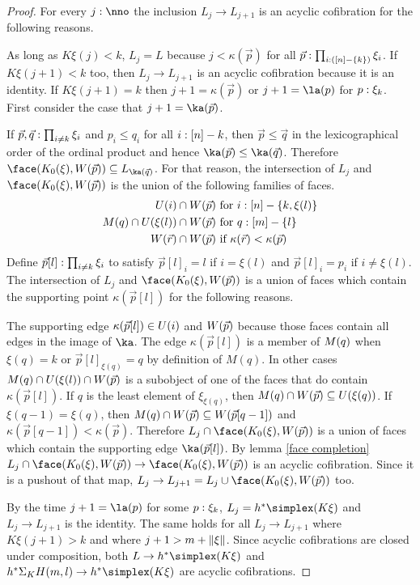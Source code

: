 \documentclass[csh.tex]{subfiles}
\begin{document}
\begin{proof}
For every $j\of\nno$ the inclusion $L_j\to L_{j+1}$ is an acyclic cofibration for the following reasons.

As long as $K\xi(j)<k$, $L_j = L$ because $j<\kappa(\vec p)$ for all $\vec p :\prod_{i:([n]-\left\{k\right\})}\xi_i$. If $K\xi(j+1)<k$ too, then $L_j\to L_{j+1}$ is an acyclic cofibration because it is an identity. If $K\xi(j+1) = k$ then $j+1=\kappa(\vec p)$ or $j+1 = \la(p)$ for $p:\xi_k$. First consider the case that $j+1=\ka(\vec p)$. 

If $\vec p,\vec q:\prod_{i\neq k} \xi_i$ and $p_i\leq q_i$ for all $i:[n]-k$, then $\vec p \leq \vec q$ in the lexicographical order of the ordinal product and hence $\ka(\vec p)\leq \ka(\vec q)$. Therefore $\face(K_0(\xi),\W(\vec p))\subseteq L_{\ka(\vec q)}$. For that reason, the intersection of $L_j$ and $\face(K_0(\xi),\W(\vec p))$ is the union of the following families of faces.
\begin{align*}
U(i)\cap W(\vec p) &\textrm{ for $i:[n]-\left\{k,\xi(l)\right\}$}\\
M(q)\cap U(\xi(l))\cap W(\vec p) &\textrm{ for $q:[m]-\left\{l\right\}$}\\
W(\vec r)\cap W(\vec p) &\textrm{ if $\kappa(\vec r)<\kappa(\vec p)$ }
\end{align*}
Define $\vec p[l]:\prod_{i\neq k} \xi_i$ to satisfy $\vec p[l]_i = l$ if $i=\xi(l)$ and $\vec p[l]_i = p_i$ if $i\neq \xi(l)$. The intersection of $L_j$ and $\face(K_0(\xi),\W(\vec p))$ is a union of faces which contain the supporting point $\kappa(\vec p[l])$ for the following reasons. 

The supporting edge $\kappa(\vec p[l])\in U(i)$ and $W(\vec p)$ because those faces contain all edges in the image of $\ka$. The edge $\kappa(\vec p[l])$ is a member of $M(q)$ when $\xi(q)=k$ or $\vec p[l]_{\xi(q)}=q$ by definition of $M(q)$. In other cases $M(q)\cap U(\xi(l))\cap W(\vec p)$ is a subobject of one of the faces that do contain $\kappa(\vec p[l])$. If $q$ is the least element of $\xi_{\xi(q)}$, then $M(q)\cap W(\vec p)\subseteq U(\xi(q))$. If $\xi(q-1)=\xi(q)$, then $M(q)\cap W(\vec p) \subseteq W(\vec p[q-1])$ and $\kappa(\vec p[q-1])<\kappa(\vec p)$. Therefore $L_j\cap \face(K_0(\xi),\W(\vec p))$ is a union of faces which contain the supporting edge $\ka(\vec p[l])$. By lemma \ref{face completion} $L_j\cap \face(K_0(\xi),\W(\vec p))\to \face(K_0(\xi),\W(\vec p))$ is an acyclic cofibration. Since it is a pushout of that map, $L_j\to L_{j+1} = L_j\cup \face(K_0(\xi),\W(\vec p))$ too.

By the time $j+1 = \la(p)$ for some $p: \xi_k$, $L_j = h\ri \simplex(K\xi)$ and $L_j\to L_{j+1}$ is the identity. The same holds for all $L_j\to L_{j+1}$ where $K\xi(j+1)>k$ and where $j+1>m+\Vert \xi \Vert$. Since acyclic cofibrations are closed under composition, both $L\to h\ri \simplex(K\xi)$ and $h\ri \depsum K H(m,l) \to h\ri \simplex(K\xi)$ are acyclic cofibrations.
\end{proof}
\end{document}
